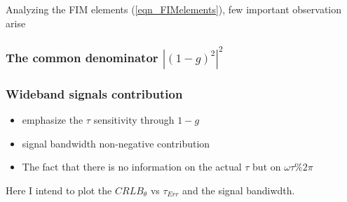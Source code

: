     \else
    \fi
\fi
Analyzing the FIM elements (\ref{eqn_FIMelements}), few important observation arise
\subsubsection*{The common denominator $\left|\left(1-g\right)^{2}\right|^{2}$}
\subsubsection*{Wideband signals contribution}
\begin{itemize}
    \item emphasize the $\tau$ sensitivity through $1-g$ 
    \item signal bandwidth non-negative contribution
    \item The fact that there is no information on the actual $\tau$ but on $\omega\tau \% 2\pi$
\end{itemize}
Here I intend to plot the $CRLB_{\theta}$ vs $\tau_{Err}$ and the signal bandiwdth.